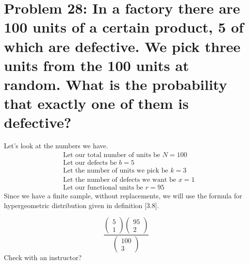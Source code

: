 \documentclass[12pt]{article}
\begin{document}
\section*{Problem 28: In a factory there are 100 units of a certain product, 5 of which are defective. We pick
three units from the 100 units at random. What is the probability that exactly one of
them is defective?}
Let's look at the numbers we have.\\
\begin{align*}
& \text{Let our total number of units be } N = 100 \\
& \text{Let our defects be } b = 5 \\
& \text{Let the number of units we pick be } k = 3 \\
& \text{Let the number of defects we want be } x = 1 \\
& \text{Let our functional units be } r = 95
\end{align*}
Since we have a finite sample, without replacements, we will use the formula for hypergeometric distribution given in definition [3.8]\cite{STAT}.





\[
\frac{\begin{pmatrix} 5\\1\end{pmatrix}\begin{pmatrix} 95\\2\end{pmatrix}
}{\begin{pmatrix} 100\\3\end{pmatrix}}
\]
Check with an instructor?












\printbibliography %
\end{document}
